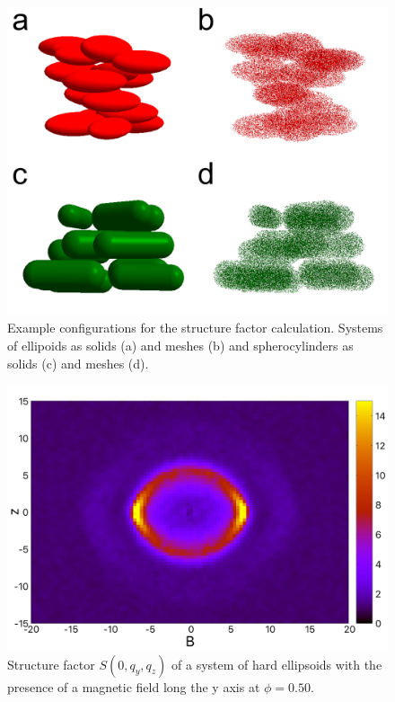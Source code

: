 \documentclass{article}
\begin{document}
\begin{figure}
    \centering
    \includegraphics[width=0.5\columnwidth]{Scatteringmodel1.png}
    \caption{Example configurations for the structure factor calculation. Systems of ellipoids as solids (a) and meshes (b) and spherocylinders as solids (c) and meshes (d).}
    \label{fig:scatt_mod1}
\end{figure}


\begin{figure}
    \centering
    \includegraphics[width=1\columnwidth]{Syz_B_HE.png}
    \caption{Structure factor $S(0, q_y, q_z)$ of a system of hard ellipsoids with the presence of a magnetic field long the y axis at $\phi=0.50$.}
    \label{fig:Syz_B_HE}
\end{figure}
\end{document}
